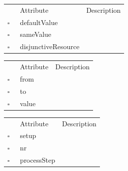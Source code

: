 \clearpage
\begin{table}
\caption{Setup  }

\begin{longtable}{llp{8cm}}
& Attribute & Description \\
$\square$\ & defaultValue &  \\
$\square$\ & sameValue &  \\
$\square$\ & disjunctiveResource &  \\
\end{longtable}
\label{attr:Setup}
\end{table}

\begin{table}
\caption{SetupMatrix  }

\begin{longtable}{llp{8cm}}
& Attribute & Description \\
$\square$\ & from &  \\
$\square$\ & to &  \\
$\square$\ & value &  \\
\end{longtable}
\label{attr:SetupMatrix}
\end{table}

\begin{table}
\caption{SetupType  }

\begin{longtable}{llp{8cm}}
& Attribute & Description \\
$\square$\ & setup &  \\
$\square$\ & nr &  \\
$\square$\ & processStep &  \\
\end{longtable}
\label{attr:SetupType}
\end{table}

